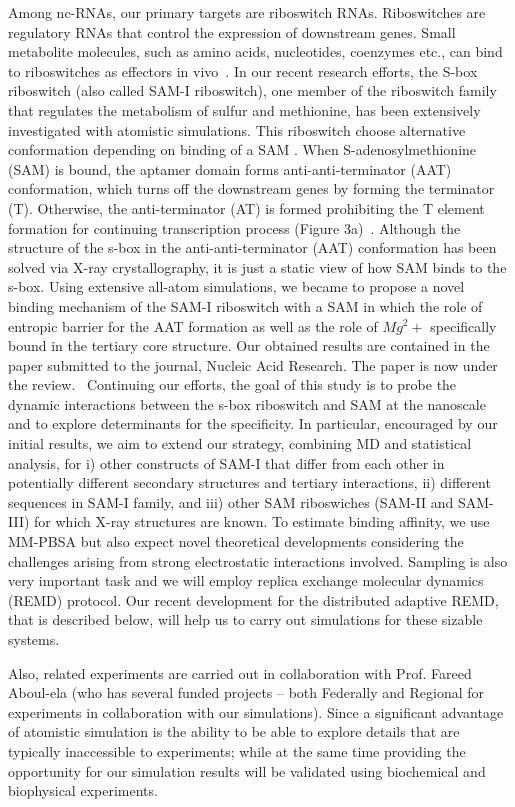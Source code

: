 \documentclass[a4paper,10pt]{article}
\begin{document}
Among nc-RNAs, our primary targets are riboswitch RNAs. Riboswitches are regulatory RNAs that control the expression of downstream genes. Small metabolite molecules, such as amino acids, nucleotides, coenzymes etc., can bind to riboswitches as effectors in vivo~\cite{mandal}.  In our recent research efforts, the S-box riboswitch (also called SAM-I riboswitch), one member of the riboswitch family that regulates the metabolism of sulfur and methionine, has been extensively investigated with atomistic simulations.  This riboswitch choose alternative conformation depending on binding of a SAM .  When S-adenosylmethionine (SAM) is bound, the aptamer domain forms anti-anti-terminator (AAT) conformation, which turns off the downstream genes by forming the terminator (T). Otherwise, the anti-terminator (AT) is formed prohibiting the T element formation for continuing transcription process (Figure 3a)~\cite{brooke}. Although the structure of the s-box in the anti-anti-terminator (AAT) conformation has been solved via X-ray crystallography, it is just a static view of how SAM binds to the s-box.  Using extensive all-atom simulations, we became to propose a novel binding mechanism of the SAM-I riboswitch with a SAM in which the role of entropic barrier for the AAT formation as well as the role of $Mg^2+$ specifically bound in the tertiary core structure.  Our obtained results are contained in the paper submitted to the journal, Nucleic Acid Research.  The paper is now under the review.~\cite{SAM-I-NAR2009} Continuing our efforts, the goal of this study is to probe the dynamic interactions between the s-box riboswitch and SAM at the nanoscale and to explore determinants for the specificity. In particular, encouraged by our initial results, we aim to extend our strategy, combining MD and statistical analysis, for i) other constructs of SAM-I that differ from each other in potentially different secondary structures and tertiary interactions, ii) different sequences in SAM-I family, and iii) other SAM riboswiches (SAM-II and SAM-III) for which X-ray structures are known.  To estimate binding affinity, we use MM-PBSA but also expect novel theoretical developments considering the challenges arising from strong electrostatic interactions involved.  Sampling is also very important task and we will employ replica exchange molecular dynamics (REMD) protocol.  Our recent development for the distributed adaptive REMD, that is described below, will help us to carry out simulations for these sizable systems.

Also, related experiments are carried out in collaboration with Prof. Fareed Aboul-ela (who has several funded projects -- both Federally and Regional for experiments in collaboration with our simulations). Since a significant advantage of atomistic simulation is the ability to be able to explore details that are typically inaccessible to experiments; while at the same time providing the opportunity for our simulation results will be validated using biochemical and biophysical experiments.
\end{document}
